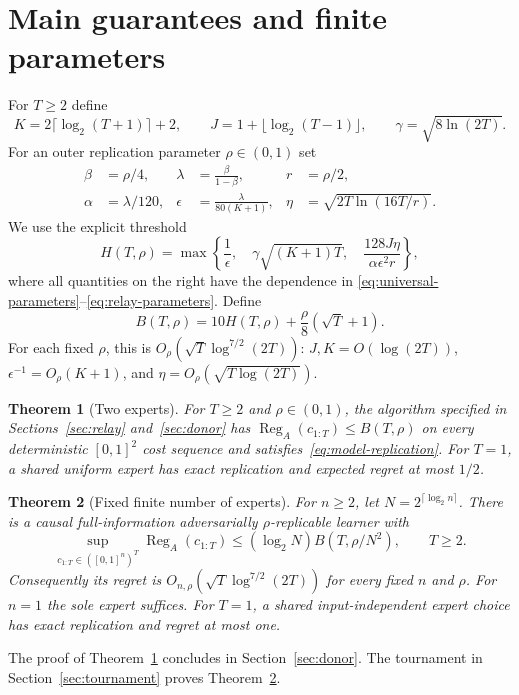 \documentclass[11pt]{article}
\newtheorem{theorem}{Theorem}[section]
\theoremstyle{remark}\newtheorem{remark}[theorem]{Remark}
\newcommand{\Reg}{\operatorname{Reg}}
\begin{document}
\section{Main guarantees and finite parameters}\label{sec:main}
For $T\ge2$ define
\begin{equation}\label{eq:universal-parameters}
 K=2\lceil\log_2(T+1)\rceil+2,\qquad
 J=1+\lfloor\log_2(T-1)\rfloor,\qquad
 \gamma=\sqrt{8\ln(2T)}.
\end{equation}
For an outer replication parameter $\rho\in(0,1)$ set
\begin{align}
 \beta&=\rho/4,& \lambda&=\frac{\beta}{1-\beta},& r&=\rho/2,
 \label{eq:mixture-parameters}\\
 \alpha&=\lambda/120,&
 \epsilon&=\frac{\lambda}{80(K+1)},&
 \eta&=\sqrt{2T\ln(16T/r)}.\label{eq:relay-parameters}
\end{align}
We use the explicit threshold
\begin{equation}\label{eq:H-choice}
 H(T,\rho)=\max\left\{
 \frac1\epsilon,\quad
 \gamma\sqrt{(K+1)T},\quad
 \frac{128J\eta}{\alpha\epsilon^2 r}
 \right\},
\end{equation}
where all quantities on the right have the dependence in
\eqref{eq:universal-parameters}--\eqref{eq:relay-parameters}. Define
\begin{equation}\label{eq:B-choice}
 B(T,\rho)=10H(T,\rho)+\frac{\rho}{8}(\sqrt T+1).
\end{equation}
For each fixed $\rho$, this is $O_\rho(\sqrt T\log^{7/2}(2T))$:
$J,K=O(\log(2T))$, $\epsilon^{-1}=O_\rho(K+1)$, and
$\eta=O_\rho(\sqrt{T\log(2T)})$.

\begin{theorem}[Two experts]\label{thm:two-expert}
For $T\ge2$ and $\rho\in(0,1)$, the algorithm specified in
Sections~\ref{sec:relay} and~\ref{sec:donor} has
$\Reg_A(c_{1:T})\le B(T,\rho)$ on every deterministic
$[0,1]^2$ cost sequence and satisfies~\eqref{eq:model-replication}.
For $T=1$, a shared uniform expert has exact replication and expected
regret at most $1/2$.
\end{theorem}

\begin{theorem}[Fixed finite number of experts]\label{thm:main}
For $n\ge2$, let $N=2^{\lceil\log_2 n\rceil}$. There is a causal
full-information adversarially $\rho$-replicable learner with
\begin{equation}\label{eq:n-bound}
 \sup_{c_{1:T}\in([0,1]^n)^T}\Reg_A(c_{1:T})
 \le (\log_2 N) B(T,\rho/N^2),\qquad T\ge2.
\end{equation}
Consequently its regret is
$O_{n,\rho}(\sqrt T\log^{7/2}(2T))$ for every fixed $n$ and $\rho$.
For $n=1$ the sole expert suffices. For $T=1$, a shared
input-independent expert choice has exact replication and regret at most
one.
\end{theorem}
The proof of Theorem~\ref{thm:two-expert} concludes in
Section~\ref{sec:donor}. The tournament in
Section~\ref{sec:tournament} proves Theorem~\ref{thm:main}.
\end{document}
